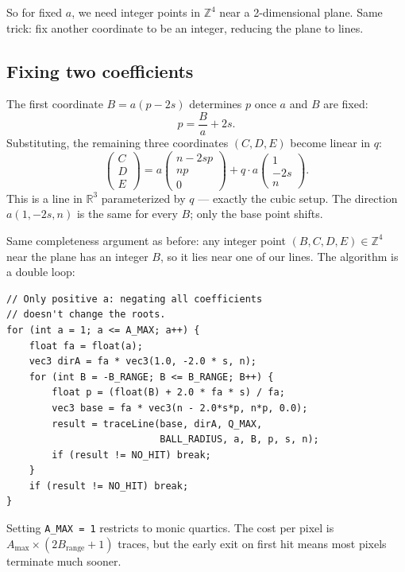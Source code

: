 \documentclass[11pt]{article}
\newcommand{\R}{\mathbb{R}}
\newcommand{\Z}{\mathbb{Z}}
\begin{document}
So for fixed $a$, we need integer points in $\Z^4$ near a 2-dimensional plane.
Same trick: fix another coordinate to be an integer, reducing the plane to lines.

\subsection{Fixing two coefficients}

The first coordinate $B = a(p - 2s)$ determines $p$ once $a$ and $B$ are fixed:
\[
    p = \frac{B}{a} + 2s.
\]
Substituting, the remaining three coordinates $(C, D, E)$ become linear in $q$:
\[
    \begin{pmatrix} C \\ D \\ E \end{pmatrix}
    = a\begin{pmatrix} n - 2sp \\ np \\ 0 \end{pmatrix}
    + q \cdot a\begin{pmatrix} 1 \\ -2s \\ n \end{pmatrix}.
\]
This is a line in $\R^3$ parameterized by $q$ --- exactly the cubic setup.
The direction $a(1, -2s, n)$ is the same for every $B$; only the base point shifts.

Same completeness argument as before: any integer point $(B, C, D, E) \in \Z^4$ near the plane has an integer $B$, so it lies near one of our lines.
The algorithm is a double loop:

\begin{lstlisting}
// Only positive a: negating all coefficients
// doesn't change the roots.
for (int a = 1; a <= A_MAX; a++) {
    float fa = float(a);
    vec3 dirA = fa * vec3(1.0, -2.0 * s, n);
    for (int B = -B_RANGE; B <= B_RANGE; B++) {
        float p = (float(B) + 2.0 * fa * s) / fa;
        vec3 base = fa * vec3(n - 2.0*s*p, n*p, 0.0);
        result = traceLine(base, dirA, Q_MAX,
                           BALL_RADIUS, a, B, p, s, n);
        if (result != NO_HIT) break;
    }
    if (result != NO_HIT) break;
}
\end{lstlisting}

Setting \texttt{A\_MAX = 1} restricts to monic quartics.
The cost per pixel is $A_{\max} \times (2 B_{\text{range}} + 1)$ traces, but the early exit on first hit means most pixels terminate much sooner.
\end{document}
